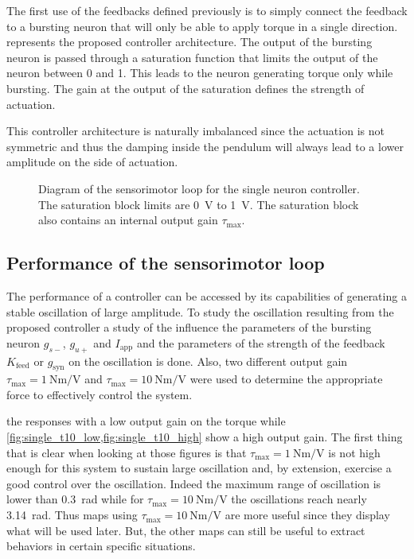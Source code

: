 The first use of the feedbacks defined previously is to simply connect the feedback to a bursting neuron that will only be able to apply torque in a single direction. 
 represents the proposed controller architecture. 
The output of the bursting neuron is passed through a saturation function that limits the output of the neuron between 0 and 1. 
This leads to the neuron generating torque only while bursting. 
The gain at the output of the saturation defines the strength of actuation. 

This controller architecture is naturally imbalanced since the actuation is not symmetric and thus the damping inside the pendulum will always lead to a lower amplitude on the side of actuation. 

\begin{figure}[!htb]
    \centering
    \caption{Diagram of the sensorimotor loop for the single neuron controller. The saturation block limits are \qty{0}{\volt} to \qty{1}{\volt}. The saturation block also contains an internal output gain $\tau_\text{max}$.}
    \label{fig:one_motor}
\end{figure}


\subsection{Performance of the sensorimotor loop}

The performance of a controller can be accessed by its capabilities of generating a stable oscillation of large amplitude.
To study the oscillation resulting from the proposed controller a study of the influence the parameters of the bursting neuron $g_{s-}$, $g_{u+}$ and $I_\text{app}$ and the parameters of the strength of the feedback $K_\text{feed}$ or $g_\text{syn}$ on the oscillation is done. 
Also, two different output gain $\tau_\text{max} = \qty{1}{\newton\meter\per\volt}$ and $\tau_\text{max} = \qty{10}{\newton\meter\per\volt}$ were used to determine the appropriate force to effectively control the system. 

  the responses with a low output gain on the torque while \cref{fig:single_t10_low,fig:single_t10_high} show a high output gain. 
The first thing that is clear when looking at those figures is that $\tau_\text{max} = \qty{1}{\newton\meter\per\volt}$ is not high enough for this system to sustain large oscillation and, by extension, exercise a good control over the oscillation. 
Indeed the maximum range of oscillation is lower than \qty{0.3}{\radian} while for $\tau_\text{max} = \qty{10}{\newton\meter\per\volt}$ the oscillations reach nearly \qty{3.14}{\radian}. 
Thus maps using $\tau_\text{max} = \qty{10}{\newton\meter\per\volt}$ are more useful since they display what will be used later. 
But, the other maps can still be useful to extract behaviors in certain specific situations.


